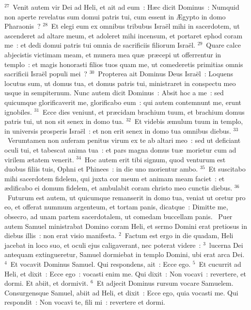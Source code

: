 ${}^{27}$~Venit autem vir Dei ad Heli, et ait ad eum~: H\ae c dicit Dominus~: Numquid non aperte revelatus sum domui patris tui, cum essent in \AE gypto in domo Pharaonis~?
${}^{28}$~Et elegi eum ex omnibus tribubus Isra\"el mihi in sacerdotem, ut ascenderet ad altare meum, et adoleret mihi incensum, et portaret ephod coram me~: et dedi domui patris tui omnia de sacrificiis filiorum Isra\"el.
${}^{29}$~Quare calce abjecistis victimam meam, et munera mea qu\ae\ pr\ae cepi ut offerrentur in templo~: et magis honorasti filios tuos quam me, ut comederetis primitias omnis sacrificii Isra\"el populi mei~?
${}^{30}$~Propterea ait Dominus Deus Isra\"el~: Loquens locutus sum, ut domus tua, et domus patris tui, ministraret in conspectu meo usque in sempiternum. Nunc autem dicit Dominus~: Absit hoc a me~: sed quicumque glorificaverit me, glorificabo eum~: qui autem contemnunt me, erunt ignobiles.
${}^{31}$~Ecce dies veniunt, et pr\ae cidam brachium tuum, et brachium domus patris tui, ut non sit senex in domo tua.
${}^{32}$~Et videbis \ae mulum tuum in templo, in universis prosperis Isra\"el~: et non erit senex in domo tua omnibus diebus.
${}^{33}$~Verumtamen non auferam penitus virum ex te ab altari meo~: sed ut deficiant oculi tui, et tabescat anima tua~: et pars magna domus tu\ae\ morietur cum ad virilem \ae tatem venerit.
${}^{34}$~Hoc autem erit tibi signum, quod venturum est duobus filiis tuis, Ophni et Phinees~: in die uno morientur ambo.
${}^{35}$~Et suscitabo mihi sacerdotem fidelem, qui juxta cor meum et animam meam faciet~: et \ae dificabo ei domum fidelem, et ambulabit coram christo meo cunctis diebus.
${}^{36}$~Futurum est autem, ut quicumque remanserit in domo tua, veniat ut oretur pro eo, et offerat nummum argenteum, et tortam panis, dicatque~: Dimitte me, obsecro, ad unam partem sacerdotalem, ut comedam buccellam panis.
~\lettrine[lines=10,image=true,loversize=0.05,lraise=-0.03]{P}{}uer autem Samuel ministrabat Domino coram Heli, et sermo Domini erat pretiosus in diebus illis~: non erat visio manifesta.
${}^{2}$~Factum est ergo in die quadam, Heli jacebat in loco suo, et oculi ejus caligaverant, nec poterat videre~:
${}^{3}$~lucerna Dei antequam extingueretur, Samuel dormiebat in templo Domini, ubi erat arca Dei.
${}^{4}$~Et vocavit Dominus Samuel. Qui respondens, ait~: Ecce ego.
${}^{5}$~Et cucurrit ad Heli, et dixit~: Ecce ego~: vocasti enim me. Qui dixit~: Non vocavi~: revertere, et dormi. Et abiit, et dormivit.
${}^{6}$~Et adjecit Dominus rursum vocare Samuelem. Consurgensque Samuel, abiit ad Heli, et dixit~: Ecce ego, quia vocasti me. Qui respondit~: Non vocavi te, fili mi~: revertere et dormi.

